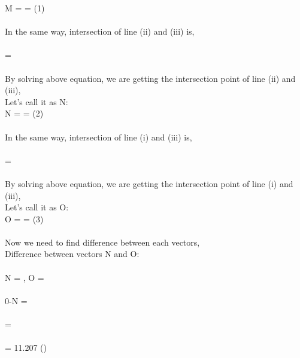 \documentclass[journal,12pt,twocolumn]{IEEEtran}
\begin{document}
M =  =  \qquad (1)\\
\\
In the same way, intersection of line (ii) and (iii) is,\\
\\

 = \\
\\
By solving above equation, we are getting the intersection point of line (ii) and (iii),\\
Let's call it as N:
\\

N =  =  \qquad (2)\\
\\
In the same way, intersection of line (i) and (iii) is,\\
\\

 = \\
\\
By solving above equation, we are getting the intersection point of line (i) and (iii),\\
Let's call it as O:
\\

O =  =  \qquad (3)\\
\\
Now we need to find difference between each vectors,\\

Difference between vectors N and O:\\ \\
N = , O = \\ \\
0-N = \\ \\
 = \\ \\
 = 11.207 \qquad\qquad ()\\ \\
\end{document}
